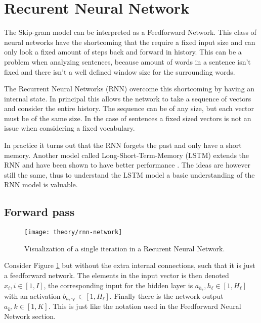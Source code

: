 
\section{Recurent Neural Network}

The Skip-gram model can be interpreted as a Feedforward Network. This class of neural networks have the shortcoming that the require a fixed input size and can only look a fixed amount of steps back and forward in history. This can be a problem when analyzing sentences, because amount of words in a sentence isn't fixed and there isn't a well defined window size for the surrounding words.

The Recurrent Neural Networks (RNN) overcome this shortcoming by having an internal state. In principal this allows the network to take a sequence of vectors and consider the entire history. The sequence can be of any size, but each vector must be of the same size. In the case of sentences a fixed sized vectors is not an issue when considering a fixed vocabulary.

In practice it turns out that the RNN forgets the past and only have a short memory. Another model called Long-Short-Term-Memory (LSTM) extends the RNN and have been shown to have better performance \cite{alexgraves}. The ideas are however still the same, thus to understand the LSTM model a basic understanding of the RNN model is valuable.

\subsection{Forward pass}

\begin{figure}[h]
	\centering
	\texttt{[image: theory/rnn-network]}
	\caption{Visualization of a single iteration in a Recurent Neural Network.}
	\label{fig:theory:rnn:rnn-network}
\end{figure}

Consider Figure \ref{fig:theory:rnn:rnn-network} but without the extra internal connections, such that it is just a feedforward network. The elements in the input vector is then denoted $x_{i}, i \in [1, I]$, the corresponding input for the hidden layer is $a_{h_\ell}, h_\ell \in [1, H_\ell]$ with an activation $b_{h_\ell}, _\ell \in [1, H_\ell]$. Finally there is the network output $a_{k}, k \in [1, K]$. This is just like the notation used in the Feedforward Neural Network section.

